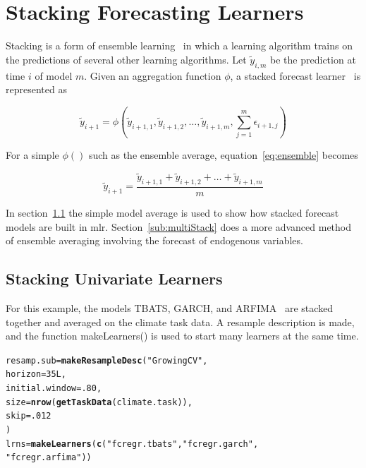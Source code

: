 \documentclass[12pt]{article}\usepackage[]{graphicx}\usepackage[]{color}
\makeatletter
\newcommand{\hlnum}[1]{\textcolor[rgb]{0.686,0.059,0.569}{#1}}%
\newcommand{\hlstr}[1]{\textcolor[rgb]{0.192,0.494,0.8}{#1}}%
\newcommand{\hlstd}[1]{\textcolor[rgb]{0.345,0.345,0.345}{#1}}%
\newcommand{\hlkwb}[1]{\textcolor[rgb]{0.69,0.353,0.396}{#1}}%
\newcommand{\hlkwc}[1]{\textcolor[rgb]{0.333,0.667,0.333}{#1}}%
\newcommand{\hlkwd}[1]{\textcolor[rgb]{0.737,0.353,0.396}{\textbf{#1}}}%
\newenvironment{kframe}{%
 \def\at@end@of@kframe{}%
 \ifinner\ifhmode%
  \def\at@end@of@kframe{\end{minipage}}%
  \begin{minipage}{\columnwidth}%
 \fi\fi%
 \def\FrameCommand##1{\hskip\@totalleftmargin \hskip-\fboxsep
 \colorbox{shadecolor}{##1}\hskip-\fboxsep
     \hskip-\linewidth \hskip-\@totalleftmargin \hskip\columnwidth}%
 \MakeFramed {\advance\hsize-\width
   \@totalleftmargin\z@ \linewidth\hsize
   \@setminipage}}%
 {\par\unskip\endMakeFramed%
 \at@end@of@kframe}
\newenvironment{knitrout}{}{} %
\theoremstyle{definition}
\newcommand\code{\@codex}
\def\@codex#1{{\normalfont\ttfamily\hyphenchar\font=-1 #1}}
\newcommand{\pkg}[1]{{\fontseries{b}\selectfont #1}}
\makeatother
\begin{document}
\section{Stacking Forecasting Learners}
\label{sec:stackfore}
Stacking is a form of ensemble learning~\cite{ensembleOverview} in which a learning algorithm trains on the predictions of several other learning algorithms. Let $\tilde{y}_{i,m}$ be the prediction at time $i$ of model $m$. Given an aggregation function $\phi$, a stacked forecast learner~\cite{combineForecast} is represented as

\begin{equation}
\tilde{y}_{i+1} = \phi(\tilde{y}_{i+1,1}, \tilde{y}_{i+1,2},\dots, \tilde{y}_{i+1,m}, \sum_{j=1}^m \epsilon_{i+1,j})
\label{eq:ensemble}
\end{equation}

For a simple $\phi()$ such as the ensemble average, equation~\ref{eq:ensemble} becomes

\begin{equation}
\tilde{y}_{i+1} = \frac{\tilde{y}_{i+1,1} + \tilde{y}_{i+1,2} +\dots + \tilde{y}_{i+1,m}}{m}
\label{eq:ensembleAverage}
\end{equation}

In section~\ref{sub:stackedUnivar} the simple model average is used to show how stacked forecast models are built in \pkg{mlr}. Section~\ref{sub:multiStack} does a more advanced method of ensemble averaging involving the forecast of endogenous variables.

\subsection{Stacking Univariate Learners}
\label{sub:stackedUnivar}

For this example, the models TBATS, GARCH, and ARFIMA~\cite{arfima} are stacked together and averaged on the climate task data. A resample description is made, and the function \code{makeLearners()} is used to start many learners at the same time.

\singlespacing
\begin{knitrout}
\color{fgcolor}\begin{kframe}
\begin{alltt}
\hlstd{resamp.sub} \hlkwb{=} \hlkwd{makeResampleDesc}\hlstd{(}\hlstr{"GrowingCV"}\hlstd{,}
                          \hlkwc{horizon} \hlstd{=} \hlnum{35L}\hlstd{,}
                          \hlkwc{initial.window} \hlstd{=} \hlnum{.80}\hlstd{,}
                          \hlkwc{size} \hlstd{=} \hlkwd{nrow}\hlstd{(}\hlkwd{getTaskData}\hlstd{(climate.task)),}
                          \hlkwc{skip} \hlstd{=} \hlnum{.012}
                          \hlstd{)}
\hlstd{lrns} \hlkwb{=} \hlkwd{makeLearners}\hlstd{(}\hlkwd{c}\hlstd{(}\hlstr{"fcregr.tbats"}\hlstd{,}\hlstr{"fcregr.garch"}\hlstd{,}
                      \hlstr{"fcregr.arfima"}\hlstd{))}
\end{alltt}
\end{kframe}
\end{knitrout}
\doublespacing
\end{document}
